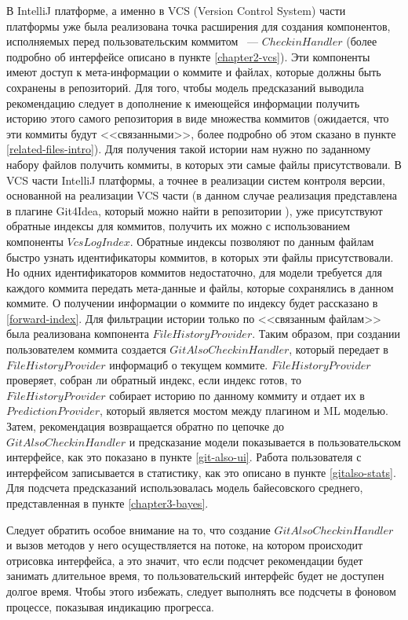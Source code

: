 В IntelliJ платформе, а именно в VCS (Version Control System) части платформы уже была реализована точка расширения для создания компонентов, исполняемых перед пользовательским коммитом ~--- $CheckinHandler$ (более подробно об интерфейсе описано в пункте \ref{chapter2-vcs}). Эти компоненты имеют доступ к мета-информации о коммите и файлах, которые должны быть сохранены в репозиторий. Для того, чтобы модель предсказаний выводила рекомендацию следует в дополнение к имеющейся информации получить историю этого самого репозитория в виде множества коммитов (ожидается, что эти коммиты будут <<связанными>>, более подробно об этом сказано в пункте \ref{related-files-intro}). Для получения такой истории нам нужно по заданному набору файлов получить коммиты, в которых эти самые файлы присутствовали. В VCS части IntelliJ платформы, а точнее в реализации систем контроля версии, основанной на реализации VCS части (в данном случае реализация представлена в плагине Git4Idea, который можно найти в репозитории \cite{ij-community}), уже присутствуют обратные индексы для коммитов, получить их можно с использованием компоненты $VcsLogIndex$. Обратные индексы позволяют по данным файлам быстро узнать идентификаторы коммитов, в которых эти файлы присутствовали. Но одних идентификаторов коммитов недостаточно, для модели требуется для каждого коммита передать мета-данные и файлы, которые сохранялись в данном коммите. О получении информации о коммите по индексу будет рассказано в \ref{forward-index}. Для фильтрации истории только по <<связанным файлам>> была реализована компонента $FileHistoryProvider$. Таким образом, при создании пользователем коммита создается $GitAlsoCheckinHandler$, который передает в $FileHistoryProvider$ информациб о текущем коммите. $FileHistoryProvider$ проверяет, собран ли обратный индекс, если индекс готов, то $FileHistoryProvider$ собирает историю по данному коммиту и отдает их в $PredictionProvider$, который является мостом между плагином и ML моделью. Затем, рекомендация возвращается обратно по цепочке до $GitAlsoCheckinHandler$ и предсказание модели показывается в пользовательском интерфейсе, как это показано в пункте \ref{git-also-ui}. Работа пользователя с интерфейсом записывается в статистику, как это описано в пункте \ref{gitalso-stats}. Для подсчета предсказаний использовалась модель байесовского среднего, представленная в пункте \ref{chapter3-bayes}.

Следует обратить особое внимание на то, что создание $GitAlsoCheckinHandler$ и вызов методов у него осуществляется на потоке, на котором происходит отрисовка интерфейса, а это значит, что если подсчет рекомендации будет занимать длительное время, то пользовательский интерфейс будет не доступен долгое время. Чтобы этого избежать, следует выполнять все подсчеты в фоновом процессе, показывая индикацию прогресса.
